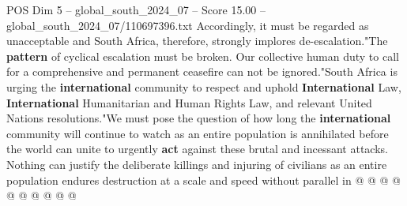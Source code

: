 \begin{textsample}{POS Dim 5 – global\_south\_2024\_07 – Score 15.00 – global\_south\_2024\_07/110697396.txt}
Accordingly, it must be regarded as unacceptable and South Africa, therefore, strongly implores de-escalation."The \textbf{pattern} of cyclical escalation must be broken.
Our collective human duty to call for a comprehensive and permanent ceasefire can not be ignored."South Africa is urging the \textbf{international} community to respect and uphold \textbf{International} Law, \textbf{International} Humanitarian and Human Rights Law, and relevant United Nations resolutions."We must pose the question of how long the \textbf{international} community will continue to watch as an entire population is annihilated before the world can unite to urgently \textbf{act} against these brutal and incessant attacks.
Nothing can justify the deliberate killings and injuring of civilians as an entire population endures destruction at a scale and speed without parallel in @ @ @ @ @ @ @ @ @ @

\end{textsample}
